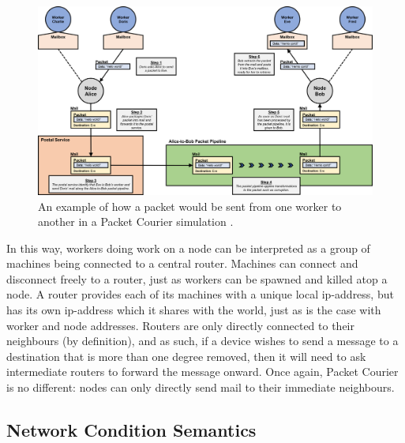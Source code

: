 \begin{figure}[!h]
    \includegraphics[width=\textwidth]{images/chapter_3_design/simulation_semantics_diagram}
    \centering
    \caption{An example of how a packet would be sent from one worker to another in a Packet Courier simulation
    .}\label{fig:chapter_3_design-simulation_semantics_diagram}
\end{figure}

In this way, workers doing work on a node can be interpreted as a group of machines being connected to a central
router. Machines can connect and disconnect freely to a router, just as workers can be spawned and killed atop a node. A
router provides each of its machines with a unique local ip-address, but has its own ip-address which it shares with
the world, just as is the case with worker and node addresses. Routers are only directly connected to their
neighbours (by definition), and as such, if a device wishes to send a message to a destination that is more than one
degree removed, then it will need to ask intermediate routers to forward the message onward. Once again, Packet
Courier is no different: nodes can only directly send mail to their immediate neighbours.

\newpage

\subsection{Network Condition Semantics}\label{subsection:network_condition_semantics}

